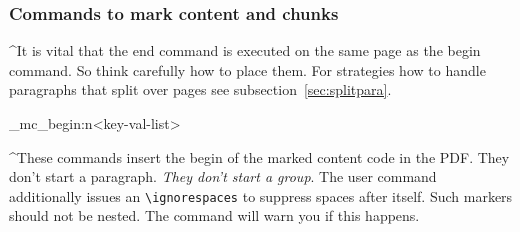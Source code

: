 \documentclass[DIV=12,parskip=half-,bibliography=totoc]{scrartcl}
\newcommand\PDF{PDF}
\begin{document}
\subsubsection{Commands to mark content and chunks}

\TagP^It is vital that the end command is executed on the same page as the begin command. So think carefully how to place them.
For strategies how to handle paragraphs that split over pages see subsection~\ref{sec:splitpara}.\TagPend

\ExplSyntaxOn
\DescribeMacro{}
\DescribeMacro\tag_mc_begin:n{<key-val-list>}
\ExplSyntaxOff

\TagP^These commands insert the begin of the marked content code in the \PDF{}. They don't start a paragraph. \emph{They don't start a group}. The user command additionally issues an \verb+\ignorespaces+ to suppress spaces after itself.
Such markers should not be nested. The command will warn you if this happens.
\end{document}
